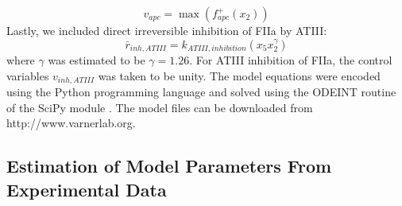 \documentclass[processes,article,received,moreauthors,pdftex,12pt,a4paper]{mdpi}
\begin{document}
\begin{equation}
	v_{apc} = \max\left(f_{apc}^{+}\left(x_{2}\right)\right)
\end{equation}
Lastly, we included direct irreversible inhibition of FIIa by ATIII:
\begin{equation}
	\bar{r}_{inh,ATIII} = k_{ATIII,inhibition}\left(x_{5}x_{2}^{\gamma}\right)
\end{equation}where $\gamma$ was estimated to be $\gamma = 1.26$. For ATIII inhibition of FIIa, the control variables $v_{inh,ATIII}$ was taken to be unity.
The model equations were encoded using the Python programming language and solved using the ODEINT routine of the SciPy module \citep{SCIPY}.
The model files can be downloaded from http://www.varnerlab.org.

\subsection{Estimation of Model Parameters From Experimental Data}
\end{document}
